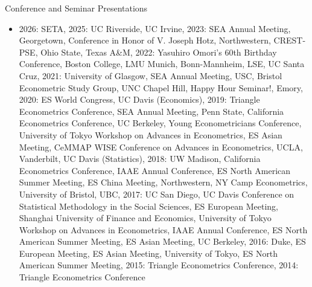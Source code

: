 \documentclass{article}
\begin{document}
\bigskip\noindent Conference and Seminar Presentations
\begin{itemize}
\item[] 
2026: 
SETA,  
2025: 
UC Riverside,  
UC Irvine,  
2023: 
SEA Annual Meeting, Georgetown, Conference in Honor of V. Joseph Hotz, Northwestern, CREST-PSE, Ohio State, Texas A\&M, 
2022: 
Yasuhiro Omori's 60th Birthday Conference, Boston College, LMU Munich, Bonn-Mannheim, LSE, UC Santa Cruz,
2021: 
University of Glasgow, SEA Annual Meeting, USC, Bristol Econometric Study Group, UNC Chapel Hill, Happy Hour Seminar!, Emory,
2020: 
ES World Congress, UC Davis (Economics),
2019: 
Triangle Econometrics Conference, SEA Annual Meeting, Penn State,  California Econometrics Conference, UC Berkeley, Young Econometricians Conference, University of Tokyo Workshop on Advances in Econometrics, ES Asian Meeting, CeMMAP WISE Conference on Advances in Econometrics, UCLA, Vanderbilt, UC Davis (Statistics),
2018: 
UW Madison, California Econometrics Conference, IAAE Annual Conference, ES North American Summer Meeting, ES China Meeting, Northwestern, NY Camp Econometrics, University of Bristol, UBC,
2017: 
UC San Diego, UC Davis Conference on Statistical Methodology in the Social Sciences, ES European Meeting, Shanghai University of Finance and Economics, University of Tokyo Workshop on Advances in Econometrics, IAAE Annual Conference, ES North American Summer Meeting, ES Asian Meeting, UC Berkeley,
2016: 
Duke, ES European Meeting, ES Asian Meeting, University of Tokyo, ES North American Summer Meeting,
2015: 
Triangle Econometrics Conference,
2014: 
Triangle Econometrics Conference
\end{itemize}
\end{document}
